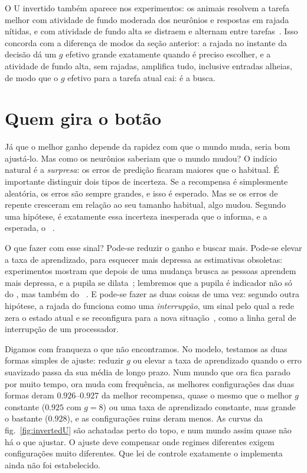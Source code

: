 O U invertido também aparece nos experimentos: os animais resolvem a tarefa melhor com atividade de fundo moderada dos neurônios  e respostas em rajada nítidas, e com atividade de fundo alta se distraem e alternam entre tarefas~\cite{AstonJones2005}. Isso concorda com a diferença de modos da seção anterior: a rajada no instante da decisão dá um $g$ efetivo grande exatamente quando é preciso escolher, e a atividade de fundo alta, sem rajadas, amplifica tudo, inclusive entradas alheias, de modo que o $g$ efetivo para a tarefa atual cai: é a busca.

\section{Quem gira o botão}

Já que o melhor ganho depende da rapidez com que o mundo muda, seria bom ajustá-lo. Mas como os neurônios  saberiam que o mundo mudou? O indício natural é a \emph{surpresa}: os erros de predição ficaram maiores que o habitual. É importante distinguir dois tipos de incerteza. Se a recompensa é simplesmente aleatória, os erros são sempre grandes, e isso é esperado. Mas se os erros de repente cresceram em relação ao seu tamanho habitual, algo mudou. Segundo uma hipótese, é exatamente essa incerteza inesperada que o  informa, e a esperada, o ~\cite{YuDayan2005}.

O que fazer com esse sinal? Pode-se reduzir o ganho e buscar mais. Pode-se elevar a taxa de aprendizado, para esquecer mais depressa as estimativas obsoletas: experimentos mostram que depois de uma mudança brusca as pessoas aprendem mais depressa, e a pupila se dilata~\cite{Nassar2012}; lembremos que a pupila é indicador não só do , mas também do ~\cite{Reimer2016}. E pode-se fazer as duas coisas de uma vez: segundo outra hipótese, a rajada do  funciona como uma \emph{interrupção}, um sinal pelo qual a rede zera o estado atual e se reconfigura para a nova situação~\cite{BouretSara2005}, como a linha geral de interrupção de um processador.

Digamos com franqueza o que não encontramos. No modelo, testamos as duas formas simples de ajuste: reduzir $g$ ou elevar a taxa de aprendizado quando o erro suavizado passa da sua média de longo prazo. Num mundo que ora fica parado por muito tempo, ora muda com frequência, as melhores configurações das duas formas deram $0.926$--$0.927$ da melhor recompensa, quase o mesmo que o melhor $g$ constante ($0.925$ com $g=8$) ou uma taxa de aprendizado constante, mas grande o bastante ($0.928$), e as configurações ruins deram menos. As curvas da fig.~\ref{fig:invertedU} são achatadas perto do topo, e num mundo assim quase não há o que ajustar. O ajuste deve compensar onde regimes diferentes exigem configurações muito diferentes. Que lei de controle exatamente o  implementa ainda não foi estabelecido.

